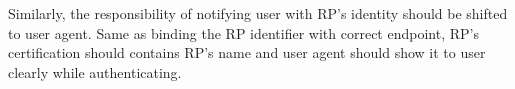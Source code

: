\begin{itemize}
Similarly, the responsibility of notifying user with RP's identity should be shifted to user agent. Same as binding the RP identifier with correct endpoint, RP's certification should contains RP's name and user agent should show it to user clearly while authenticating.
\end{itemize}


\begin{comment}
\subsection{Challenges and Solutions in OIDC}
OIDC is designed for the centralized systems. Therefore, prior coordination is required between RP and IdP so that RP registers its individual attributes (i.e., \verb+redirect_uris+) and gets client attributes (i.e., \verb+client_id+) issued by IdP. While the authentication request is transmitted from RP, IdP verifies the validation of \verb+client_id+ and \verb+redirect_uri+ because it only provide service to those RPs already registered. Therefore, if an RP builds the authentication request without \verb+client_id+ and \verb+redirect_uri+, IdP considers it invalid.

With dynamic registration, an RP has the ability to re-register the new \verb+client_id+ and \verb+redirect_uri+ with IdP. Therefore, it is needed that before the authentication request is transmitted to IdP, RP should re-register the newly generated \verb+client_id+ and completely random \verb+redirect_uri+ with IdP. The registration should be conducted by the user to avoid direct interactive between RP and IdP. However, the specification~\cite{DynamicRegistration} of OIDC dynamic registration requires the registration request should carry a bearer token as well as the new  \verb+client_id+ is generated by IdP. To avoid IdP finding out RP's identity through dynamic registration, the requirement of registration token should be omitted. It is also needed to enable RP to assign the specific \verb+client_id+. It is observed that although \verb+client_id+ is defined to be generated by IdP, some OIDC systems (e.g., MITREid Connect) enable the \verb+client_id+ be the input attribute.
\end{comment}



